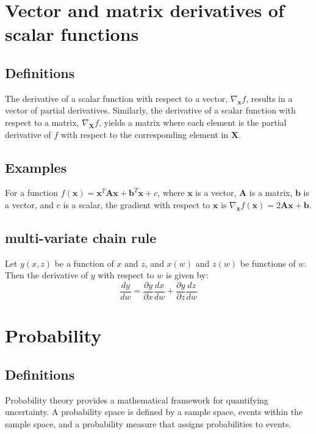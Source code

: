 \documentclass[11pt]{book} %
\begin{document}
\section{Vector and matrix derivatives of scalar functions}

\subsection{Definitions}

The derivative of a scalar function with respect to a vector, \(\nabla_{\mathbf{x}} f\), results in a vector of partial derivatives. Similarly, the derivative of a scalar function with respect to a matrix, \(\nabla_{\mathbf{X}} f\), yields a matrix where each element is the partial derivative of \(f\) with respect to the corresponding element in \(\mathbf{X}\).

\subsection{Examples}

For a function \(f(\mathbf{x}) = \mathbf{x}^T\mathbf{A}\mathbf{x} + \mathbf{b}^T\mathbf{x} + c\), where \(\mathbf{x}\) is a vector, \(\mathbf{A}\) is a matrix, \(\mathbf{b}\) is a vector, and \(c\) is a scalar, the gradient with respect to \(\mathbf{x}\) is \(\nabla_{\mathbf{x}} f(\mathbf{x}) = 2\mathbf{A}\mathbf{x} + \mathbf{b}\).

\subsection{multi-variate chain rule}
Let $y(x,z)$ be a function of $x$ and $z$, and $x(w)$ and $z(w)$ be functions of $w$. 
Then the derivative of $y$ with respect to $w$ is given by:
\begin{equation}
    \frac{dy}{dw} = \frac{\partial y}{\partial x} \frac{dx}{dw} + \frac{\partial y}{\partial z} \frac{dz}{dw}
\end{equation}

%
%
%

\section{Probability}

\subsection{Definitions}

Probability theory provides a mathematical framework for quantifying uncertainty. A probability space is defined by a sample space, events within the sample space, and a probability measure that assigns probabilities to events.
\end{document}
